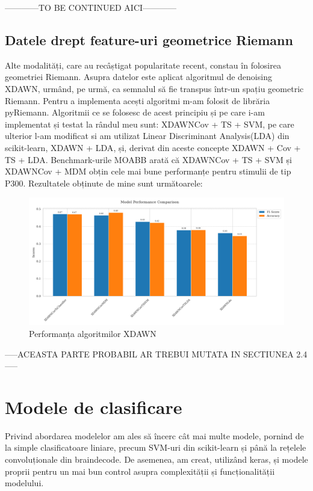------------TO BE CONTINUED AICI------------

\subsection{Datele drept feature-uri geometrice Riemann}
Alte modalități, care au recâștigat popularitate recent, constau în folosirea geometriei Riemann. Asupra datelor este aplicat algoritmul de denoising XDAWN\cite{xdawn}, urmând, pe urmă, ca semnalul să fie transpus într-un spațiu geometric Riemann. Pentru a implementa acești algoritmi m-am folosit de librăria pyRiemann\cite{pyriemann}. Algoritmii ce se folosesc de acest principiu și pe care i-am implementat și testat la rândul meu sunt: XDAWNCov + TS + SVM\cite{xdawncovtssvm}, pe care ulterior l-am modificat si am utilizat Linear Discriminant Analysis(LDA) din scikit-learn, XDAWN + LDA\cite{xdawnlda}, și, derivat din aceste concepte XDAWN + Cov + TS + LDA. Benchmark-urile MOABB\cite{moabb}  arată că XDAWNCov + TS + SVM și XDAWNCov + MDM obțin cele mai bune performanțe pentru stimulii de tip P300. Rezultatele obținute de mine sunt următoarele:

\vspace{1em}
\begin{figure}[h]
    \centering
    \includegraphics[width=1\linewidth]{comparison_xdawn.png}
    \caption{Performanța algoritmilor XDAWN}
    \label{fig:enter-label}
\end{figure}

-----ACEASTA PARTE PROBABIL AR TREBUI MUTATA IN SECTIUNEA 2.4-----

\section{Modele de clasificare}
Privind abordarea modelelor am ales să încerc cât mai multe modele, pornind de la simple clasificatoare liniare, precum SVM-uri din scikit-learn\cite{scikit-learn} și până la rețelele convoluționale din braindecode\cite{braindecode}. De asemenea, am creat, utilizând keras\cite{keras}, și modele proprii pentru un mai bun control asupra complexității și funcționalității modelului.
